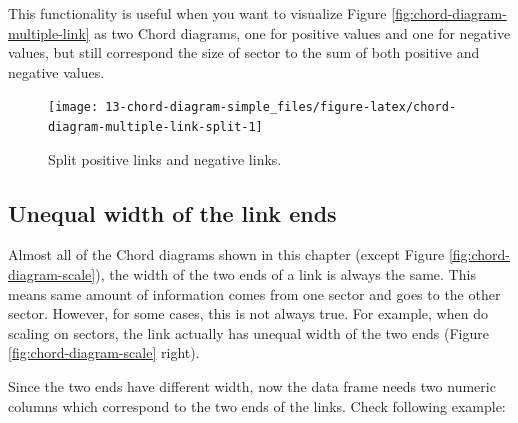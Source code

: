 \documentclass[]{book}
\newenvironment{Shaded}{\begin{snugshade}}{\end{snugshade}}
\newcommand{\KeywordTok}[1]{\textcolor[rgb]{0.13,0.29,0.53}{\textbf{#1}}}
\newcommand{\DataTypeTok}[1]{\textcolor[rgb]{0.13,0.29,0.53}{#1}}
\newcommand{\DecValTok}[1]{\textcolor[rgb]{0.00,0.00,0.81}{#1}}
\newcommand{\StringTok}[1]{\textcolor[rgb]{0.31,0.60,0.02}{#1}}
\newcommand{\OperatorTok}[1]{\textcolor[rgb]{0.81,0.36,0.00}{\textbf{#1}}}
\newcommand{\NormalTok}[1]{#1}
\begin{document}
This functionality is useful when you want to visualize Figure
\ref{fig:chord-diagram-multiple-link} as two Chord diagrams, one for
positive values and one for negative values, but still correspond the
size of sector to the sum of both positive and negative values.

\begin{Shaded}
\end{Shaded}

\begin{figure}

{\centering \texttt{[image: 13-chord-diagram-simple\_files/figure-latex/chord-diagram-multiple-link-split-1]} 

}

\caption{Split positive links and negative links.}\label{fig:chord-diagram-multiple-link-split}
\end{figure}

\subsection{Unequal width of the link
ends}\label{unequal-width-of-the-link-ends}

Almost all of the Chord diagrams shown in this chapter (except Figure
\ref{fig:chord-diagram-scale}), the width of the two ends of a link is
always the same. This means same amount of information comes from one
sector and goes to the other sector. However, for some cases, this is
not always true. For example, when do scaling on sectors, the link
actually has unequal width of the two ends (Figure
\ref{fig:chord-diagram-scale} right).

Since the two ends have different width, now the data frame needs two
numeric columns which correspond to the two ends of the links. Check
following example:
\end{document}
